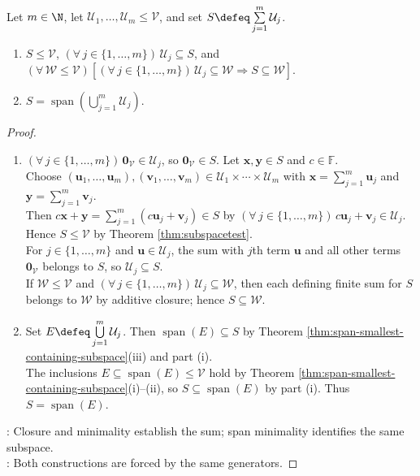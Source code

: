 \begin{proposition} \label{prop:sum-subspaces-smallest-containing-subspace} \\
Let $m\in\N$, let $\mathcal{U}_1,\ldots,\mathcal{U}_m\leq\mathcal{V}$, and set $S\defeq\sum\limits_{j=1}^{m}\mathcal{U}_j$.
\begin{enumerate}[label=(\roman*)]
\setlength{\itemsep}{0pt}
\item $S\leq\mathcal{V}$, $(\forall\,j\in\{1,\ldots,m\})\,\mathcal{U}_j\subseteq S$, and $(\forall\,\mathcal{W}\leq\mathcal{V})[(\forall\,j\in\{1,\ldots,m\})\,\mathcal{U}_j\subseteq\mathcal{W}\Rightarrow S\subseteq\mathcal{W}]$.
\item $S=\operatorname{span}(\bigcup\limits_{j=1}^{m}\mathcal{U}_j)$.
\end{enumerate}
\begin{proof}
\begin{enumerate}[label=(\roman*)]
\setlength{\itemsep}{0pt}
\item $(\forall\,j\in\{1,\ldots,m\})\,\mathbf{0}_{\mathcal{V}}\in\mathcal{U}_j$, so $\mathbf{0}_{\mathcal{V}}\in S$. Let $\mathbf{x},\mathbf{y}\in S$ and $c\in\mathbb{F}$.\\
Choose $(\mathbf{u}_1,\ldots,\mathbf{u}_m),(\mathbf{v}_1,\ldots,\mathbf{v}_m)\in\mathcal{U}_1\times\cdots\times\mathcal{U}_m$ with $\mathbf{x}=\sum\limits_{j=1}^{m}\mathbf{u}_j$ and $\mathbf{y}=\sum\limits_{j=1}^{m}\mathbf{v}_j$.\\
Then $c\mathbf{x}+\mathbf{y}=\sum\limits_{j=1}^{m}(c\mathbf{u}_j+\mathbf{v}_j)\in S$ by $(\forall\,j\in\{1,\ldots,m\})\,c\mathbf{u}_j+\mathbf{v}_j\in\mathcal{U}_j$. Hence $S\leq\mathcal{V}$ by Theorem \ref{thm:subspacetest}.\\
For $j\in\{1,\ldots,m\}$ and $\mathbf{u}\in\mathcal{U}_j$, the sum with $j$th term $\mathbf{u}$ and all other terms $\mathbf{0}_{\mathcal{V}}$ belongs to $S$, so $\mathcal{U}_j\subseteq S$.\\
If $\mathcal{W}\leq\mathcal{V}$ and $(\forall\,j\in\{1,\ldots,m\})\,\mathcal{U}_j\subseteq\mathcal{W}$, then each defining finite sum for $S$ belongs to $\mathcal{W}$ by additive closure; hence $S\subseteq\mathcal{W}$.
\item Set $E\defeq\bigcup\limits_{j=1}^{m}\mathcal{U}_j$. Then $\operatorname{span}(E)\subseteq S$ by Theorem \ref{thm:span-smallest-containing-subspace}(iii) and part (i).\\
The inclusions $E\subseteq\operatorname{span}(E)\leq\mathcal{V}$ hold by Theorem \ref{thm:span-smallest-containing-subspace}(i)--(ii), so $S\subseteq\operatorname{span}(E)$ by part (i). Thus $S=\operatorname{span}(E)$.
\end{enumerate}
: Closure and minimality establish the sum; span minimality identifies the same subspace.\\
: Both constructions are forced by the same generators.
\end{proof}
\end{proposition}

